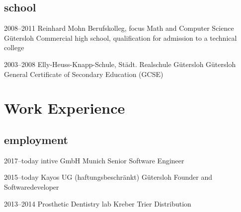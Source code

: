\documentclass[]{friggeri-cv} %
\begin{document}
\subsection{school}

	\begin{entrylist}
	
	\entry
	{2008--2011}
	{Reinhard Mohn Berufskolleg, focus Math and Computer Science}
	{G\"{u}tersloh}
	{Commercial high school, qualification for admission to a technical college}
	
	
	\entry
	{2003--2008}
	{Elly-Heuss-Knapp-Schule, St\"{a}dt. Realschule G\"{u}tersloh}
	{G\"{u}tersloh}
	{General Certificate of Secondary Education (GCSE)}
	
%	
%	

\end{entrylist}


\section{Work Experience}

\subsection{employment}

	
	\begin{entrylist}
		
	\entry
	{2017--today}
	{intive GmbH}
	{Munich}
	{Senior Software Engineer}
		
	
	\entry
	{2015--today}
	{Kayos UG (haftungsbeschr\"{a}nkt)}
	{G\"{u}tersloh}
	{Founder and Softwaredeveloper}

	
	\entry
	{2013--2014}
	{Prosthetic Dentistry lab Kreber}
	{Trier}
	{Distribution}


\end{entrylist}
\end{document}
